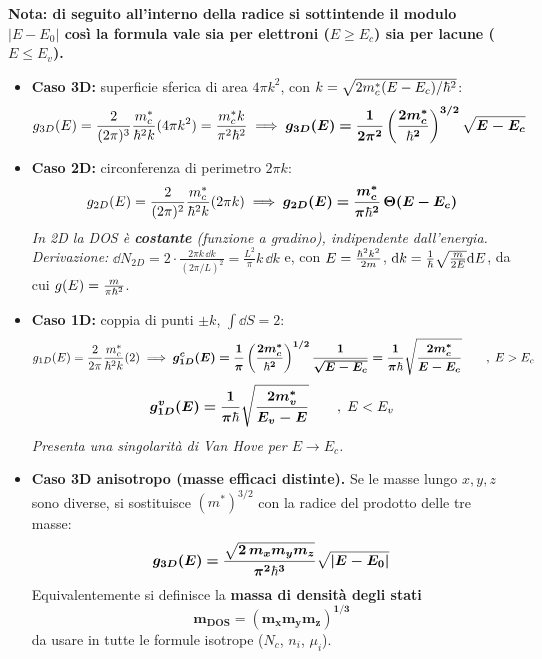 \vspace{0.3cm}
\textbf{Nota: di seguito all'interno della radice si sottintende il modulo $|E-E_0|$ così la formula vale sia per elettroni ($E\ge E_c$) sia per lacune ($E\le E_v$).}

\begin{itemize}
    \item \textbf{Caso 3D:} superficie sferica di area $4\pi k^2$, con $k=\sqrt{2m_c^*(E-E_c)/\hbar^2}$:
\[ g_{3D}(E) = \frac{2}{(2\pi)^3}\frac{m_c^*}{\hbar^2k}(4\pi k^2) = \frac{m_c^*k}{\pi^2\hbar^2}
   \implies \bm{g_{3D}(E)=\frac{1}{2\pi^2}\left(\frac{2m_c^*}{\hbar^2}\right)^{3/2}\sqrt{E-E_c}} \]
\item \textbf{Caso 2D:} circonferenza di perimetro $2\pi k$:
\[ g_{2D}(E) = \frac{2}{(2\pi)^2}\frac{m_c^*}{\hbar^2k}(2\pi k) \implies \bm{g_{2D}(E)=\frac{m_c^*}{\pi\hbar^2}\,\Theta(E-E_c)} \]
\textit{In 2D la DOS è \textbf{costante} (funzione a gradino), indipendente dall'energia.}
\\ \textit{Derivazione:} $\dd N_{2D} = 2\cdot\frac{2\pi k\,\dd k}{(2\pi/L)^2} = \frac{L^2}{\pi}k\,\dd k$ e, con $E=\frac{\hbar^2k^2}{2m}$, $\mathrm{d} k = \frac{1}{\hbar}\sqrt{\frac{m}{2E}}\mathrm{d} E$, da cui $g(E)=\frac{m}{\pi\hbar^2}$.

\item \textbf{Caso 1D:} coppia di punti $\pm k$, $\int \dd S=2$:
\[ g_{1D}(E) = \frac{2}{2\pi}\frac{m_c^*}{\hbar^2k}(2) \implies \bm{g^c_{1D}(E)=\frac{1}{\pi}\left(\frac{2m_c^*}{\hbar^2}\right)^{1/2}\frac{1}{\sqrt{E-E_c}} = \frac{1}{\pi\hbar}\sqrt{\frac{2m_c^*}{E-E_c}}} \qquad, \; E>E_c \]
\[\bm{g^v_{1D}(E) = \frac{1}{\pi\hbar}\sqrt{\frac{2m_v^*}{E_v-E}}}  \qquad , \; E<E_v\]
\textit{Presenta una singolarità di Van Hove per $E\to E_c$.}

\item \textbf{Caso 3D anisotropo (masse efficaci distinte).} Se le masse lungo $x,y,z$ sono diverse, si sostituisce $(m^*)^{3/2}$ con la radice del prodotto delle tre masse:
\[ \bm{g_{3D}(E)=\frac{\sqrt{2\,m_xm_ym_z}}{\pi^2\hbar^3}\sqrt{|E-E_0|}} \]
Equivalentemente si definisce la \textbf{massa di densità degli stati}
\[ \bm{m_{DOS} = (m_xm_ym_z)^{1/3}} \]
da usare in tutte le formule isotrope ($N_c$, $n_i$, $\mu_i$).
\end{itemize}

